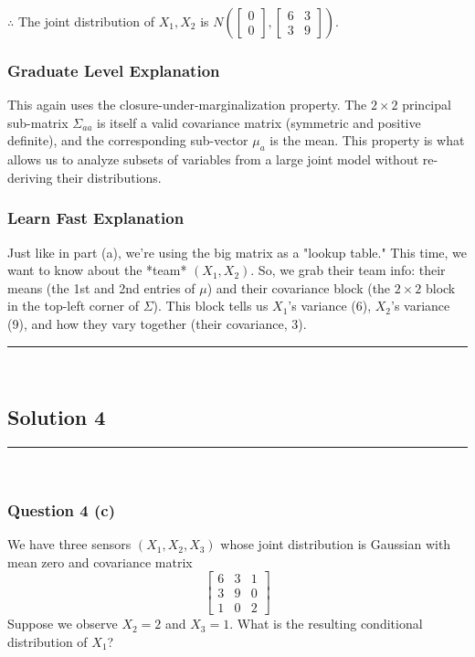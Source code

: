 \documentclass{article}
\begin{document}
\subsubsection*{\normalfont}{$\therefore$ The joint distribution of $X_1, X_2$ is $N\left(\begin{bmatrix} 0 \\ 0 \end{bmatrix}, \begin{bmatrix} 6 & 3 \\ 3 & 9 \end{bmatrix}\right)$.}

\subsubsection*{Graduate Level Explanation}
This again uses the closure-under-marginalization property. The $2 \times 2$ principal sub-matrix $\Sigma_{aa}$ is itself a valid covariance matrix (symmetric and positive definite), and the corresponding sub-vector $\mu_a$ is the mean. This property is what allows us to analyze subsets of variables from a large joint model without re-deriving their distributions.

\subsubsection*{Learn Fast Explanation}
Just like in part (a), we're using the big matrix as a "lookup table." This time, we want to know about the *team* $(X_1, X_2)$. So, we grab their team info: their means (the 1st and 2nd entries of $\mu$) and their covariance block (the $2 \times 2$ block in the top-left corner of $\Sigma$). This block tells us $X_1$'s variance (6), $X_2$'s variance (9), and how they vary together (their covariance, 3).

\noindent\rule{\textwidth}{0.4pt}\\

\newpage

\subsection*{Solution 4}
\noindent\rule{\textwidth}{0.4pt}\\
\subsubsection*{Question 4 (c)}
\begin{flushleft}
    We have three sensors $(X_1, X_2, X_3)$ whose joint distribution is Gaussian with mean zero and covariance matrix 
    \[
    \begin{bmatrix}
    6 & 3 & 1 \\
    3 & 9 & 0 \\
    1 & 0 & 2
    \end{bmatrix}
    \]
    Suppose we observe $X_2=2$ and $X_3=1$. 
    What is the resulting conditional distribution of $X_1$? 
\end{flushleft}
\end{document}
